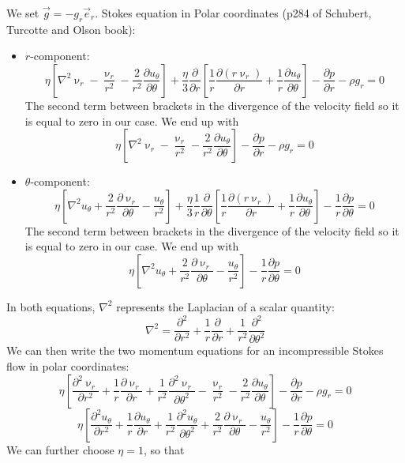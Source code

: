 We set ${\vec g}=-g_r {\vec e}_r$.
Stokes equation in Polar coordinates (p284 of Schubert, Turcotte and Olson book):
\begin{itemize}
\item 
$r$-component:
\[
\eta \left[ \nabla^2 \upnu_r - \frac{\upnu_r}{r^2} - \frac{2}{r^2} \frac{\partial u_\theta}{\partial \theta}  \right]
+
\frac{\eta}{3} \frac{\partial}{\partial r} \left[ \frac{1}{r}\frac{\partial (r \upnu_r)}{\partial r} + \frac{1}{r} \frac{\partial u_\theta}{\partial \theta}  \right]
-\frac{\partial p}{\partial r} - \rho g_r = 0
\]
The second term between brackets in the divergence of the velocity field so it is equal to zero in our case. We end up with 
\[
\eta \left[ \nabla^2 \upnu_r - \frac{\upnu_r}{r^2} - \frac{2}{r^2} \frac{\partial u_\theta}{\partial \theta}  \right]
-\frac{\partial p}{\partial r} - \rho g_r = 0
\]
\item 
$\theta$-component:
\[
\eta \left[ \nabla^2 u_\theta +\frac{2}{r^2} \frac{\partial \upnu_r}{\partial \theta} - \frac{u_\theta}{r^2} \right]
+
\frac{\eta}{3} \frac{1}{r} \frac{\partial }{\partial \theta} 
\left[
\frac{1}{r}\frac{\partial (r \upnu_r)}{\partial r} + \frac{1}{r} \frac{\partial u_\theta}{\partial \theta} 
\right]
- \frac{1}{r} \frac{\partial p}{\partial \theta}  = 0
\]
The second term between brackets in the divergence of the velocity field so it is equal to zero in our case. We end up with 
\[
\eta \left[ \nabla^2 u_\theta +\frac{2}{r^2} \frac{\partial \upnu_r}{\partial \theta} - \frac{u_\theta}{r^2} \right]
- \frac{1}{r}\frac{\partial p}{\partial \theta} = 0
\]
\end{itemize}
In both equations, $\nabla^2$ represents the Laplacian of a scalar quantity:
\[
\nabla^2 = \frac{\partial^2}{\partial r^2} + \frac{1}{r} \frac{\partial }{\partial r} + \frac{1}{r^2} \frac{\partial^2 }{\partial \theta^2}
\]
We can then write the two momentum equations for an incompressible Stokes flow in polar coordinates:
\[
\eta \left[ 
\frac{\partial^2 \upnu_r}{\partial r^2} + \frac{1}{r} \frac{\partial \upnu_r}{\partial r} 
+ \frac{1}{r^2} \frac{\partial^2 \upnu_r}{\partial \theta^2}
- \frac{\upnu_r}{r^2} - \frac{2}{r^2} \frac{\partial u_\theta}{\partial \theta}  \right]
-\frac{\partial p}{\partial r} - \rho g_r = 0
\]
\[
\eta \left[ 
\frac{\partial^2 u_\theta}{\partial r^2} + \frac{1}{r} \frac{\partial u_\theta}{\partial r} 
+ \frac{1}{r^2} \frac{\partial^2 u_\theta}{\partial \theta^2}
+\frac{2}{r^2} \frac{\partial \upnu_r}{\partial \theta} - \frac{u_\theta}{r^2} \right]
- \frac{1}{r}\frac{\partial p}{\partial \theta}  = 0
\]
We can further choose $\eta=1$, so that 
